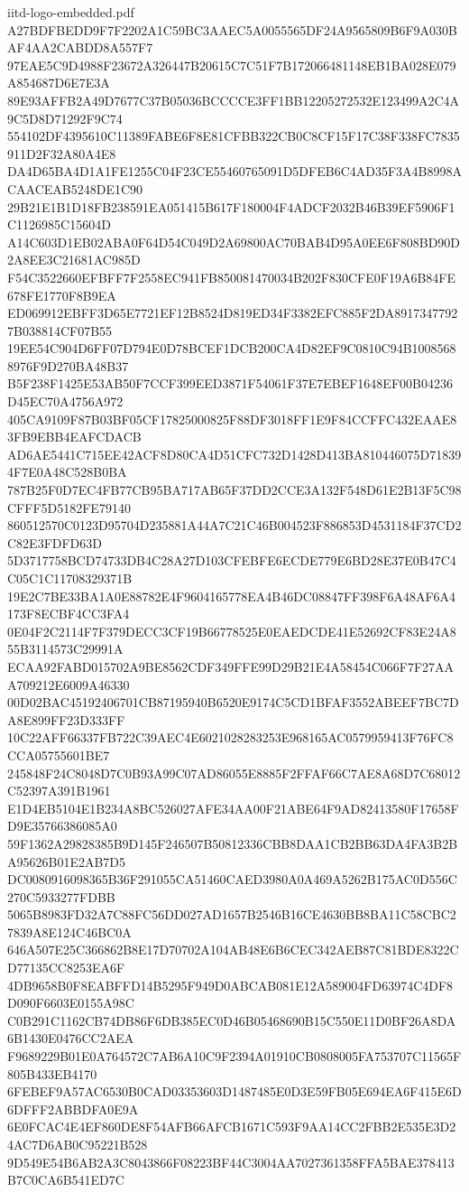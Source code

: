 \begin{filecontents*}[overwrite]{iitd-logo-embedded.pdf}
A27BDFBEDD9F7F2202A1C59BC3AAEC5A0055565DF24A9565809B6F9A030BAF4AA2CABDD8A557F7
97EAE5C9D4988F23672A326447B20615C7C51F7B172066481148EB1BA028E079A854687D6E7E3A
89E93AFFB2A49D7677C37B05036BCCCCE3FF1BB12205272532E123499A2C4A9C5D8D71292F9C74
554102DF4395610C11389FABE6F8E81CFBB322CB0C8CF15F17C38F338FC7835911D2F32A80A4E8
DA4D65BA4D1A1FE1255C04F23CE55460765091D5DFEB6C4AD35F3A4B8998ACAACEAB5248DE1C90
29B21E1B1D18FB238591EA051415B617F180004F4ADCF2032B46B39EF5906F1C1126985C15604D
A14C603D1EB02ABA0F64D54C049D2A69800AC70BAB4D95A0EE6F808BD90D2A8EE3C21681AC985D
F54C3522660EFBFF7F2558EC941FB850081470034B202F830CFE0F19A6B84FE678FE1770F8B9EA
ED069912EBFF3D65E7721EF12B8524D819ED34F3382EFC885F2DA89173477927B038814CF07B55
19EE54C904D6FF07D794E0D78BCEF1DCB200CA4D82EF9C0810C94B10085688976F9D270BA48B37
B5F238F1425E53AB50F7CCF399EED3871F54061F37E7EBEF1648EF00B04236D45EC70A4756A972
405CA9109F87B03BF05CF17825000825F88DF3018FF1E9F84CCFFC432EAAE83FB9EBB4EAFCDACB
AD6AE5441C715EE42ACF8D80CA4D51CFC732D1428D413BA810446075D718394F7E0A48C528B0BA
787B25F0D7EC4FB77CB95BA717AB65F37DD2CCE3A132F548D61E2B13F5C98CFFF5D5182FE79140
860512570C0123D95704D235881A44A7C21C46B004523F886853D4531184F37CD2C82E3FDFD63D
5D3717758BCD74733DB4C28A27D103CFEBFE6ECDE779E6BD28E37E0B47C4C05C1C11708329371B
19E2C7BE33BA1A0E88782E4F9604165778EA4B46DC08847FF398F6A48AF6A4173F8ECBF4CC3FA4
0E04F2C2114F7F379DECC3CF19B66778525E0EAEDCDE41E52692CF83E24A855B3114573C29991A
ECAA92FABD015702A9BE8562CDF349FFE99D29B21E4A58454C066F7F27AAA709212E6009A46330
00D02BAC45192406701CB87195940B6520E9174C5CD1BFAF3552ABEEF7BC7DA8E899FF23D333FF
10C22AFF66337FB722C39AEC4E6021028283253E968165AC0579959413F76FC8CCA05755601BE7
245848F24C8048D7C0B93A99C07AD86055E8885F2FFAF66C7AE8A68D7C68012C52397A391B1961
E1D4EB5104E1B234A8BC526027AFE34AA00F21ABE64F9AD82413580F17658FD9E35766386085A0
59F1362A29828385B9D145F246507B50812336CBB8DAA1CB2BB63DA4FA3B2BA95626B01E2AB7D5
DC0080916098365B36F291055CA51460CAED3980A0A469A5262B175AC0D556C270C5933277FDBB
5065B8983FD32A7C88FC56DD027AD1657B2546B16CE4630BB8BA11C58CBC27839A8E124C46BC0A
646A507E25C366862B8E17D70702A104AB48E6B6CEC342AEB87C81BDE8322CD77135CC8253EA6F
4DB9658B0F8EABFFD14B5295F949D0ABCAB081E12A589004FD63974C4DF8D090F6603E0155A98C
C0B291C1162CB74DB86F6DB385EC0D46B05468690B15C550E11D0BF26A8DA6B1430E0476CC2AEA
F9689229B01E0A764572C7AB6A10C9F2394A01910CB0808005FA753707C11565F805B433EB4170
6FEBEF9A57AC6530B0CAD03353603D1487485E0D3E59FB05E694EA6F415E6D6DFFF2ABBDFA0E9A
6E0FCAC4E4EF860DE8F54AFB66AFCB1671C593F9AA14CC2FBB2E535E3D24AC7D6AB0C95221B528
9D549E54B6AB2A3C8043866F08223BF44C3004AA7027361358FFA5BAE378413B7C0CA6B541ED7C

\end{filecontents*}
